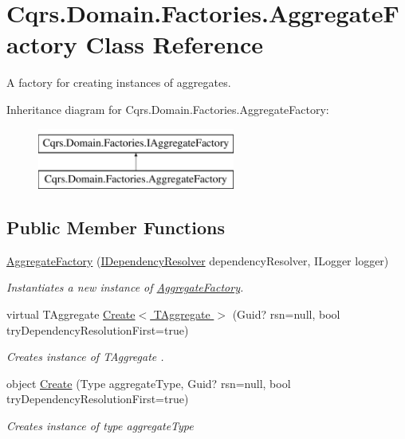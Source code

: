 \hypertarget{classCqrs_1_1Domain_1_1Factories_1_1AggregateFactory}{}\section{Cqrs.\+Domain.\+Factories.\+Aggregate\+Factory Class Reference}
\label{classCqrs_1_1Domain_1_1Factories_1_1AggregateFactory}


A factory for creating instances of aggregates.  


Inheritance diagram for Cqrs.\+Domain.\+Factories.\+Aggregate\+Factory\+:\begin{figure}[H]
\begin{center}
\leavevmode
\includegraphics[height=2.000000cm]{classCqrs_1_1Domain_1_1Factories_1_1AggregateFactory}
\end{center}
\end{figure}
\subsection*{Public Member Functions}
\begin{DoxyCompactItemize}
\item 
\hyperlink{classCqrs_1_1Domain_1_1Factories_1_1AggregateFactory_a8731bed6c8a8594c17bf0d32ff83939a_a8731bed6c8a8594c17bf0d32ff83939a}{Aggregate\+Factory} (\hyperlink{interfaceCqrs_1_1Configuration_1_1IDependencyResolver}{I\+Dependency\+Resolver} dependency\+Resolver, I\+Logger logger)
\begin{DoxyCompactList}\small\item\em Instantiates a new instance of \hyperlink{classCqrs_1_1Domain_1_1Factories_1_1AggregateFactory}{Aggregate\+Factory}. \end{DoxyCompactList}\item 
virtual T\+Aggregate \hyperlink{classCqrs_1_1Domain_1_1Factories_1_1AggregateFactory_ac155d6c1e55ba37bacf420185b652092_ac155d6c1e55ba37bacf420185b652092}{Create$<$ T\+Aggregate $>$} (Guid? rsn=null, bool try\+Dependency\+Resolution\+First=true)
\begin{DoxyCompactList}\small\item\em Creates instance of {\itshape T\+Aggregate} . \end{DoxyCompactList}\item 
object \hyperlink{classCqrs_1_1Domain_1_1Factories_1_1AggregateFactory_a917794af09bb3f51629e7abc231f8441_a917794af09bb3f51629e7abc231f8441}{Create} (Type aggregate\+Type, Guid? rsn=null, bool try\+Dependency\+Resolution\+First=true)
\begin{DoxyCompactList}\small\item\em Creates instance of type {\itshape aggregate\+Type}  \end{DoxyCompactList}\end{DoxyCompactItemize}
